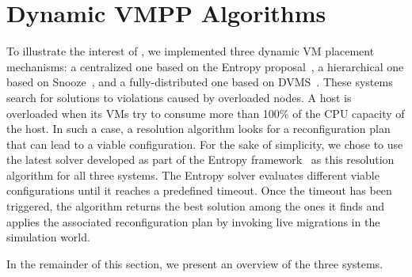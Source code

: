 \section{Dynamic VMPP Algorithms}
\label{sec:vm-schedulers}

To illustrate the interest of \vmps, we implemented three dynamic VM
placement mechanisms: a centralized one based on the Entropy
proposal~\cite{Hermenier:2009:ECM:1508293.1508300}, a hierarchical one
based on Snooze~\cite{feller:ccgrid12}, and a fully-distributed one
based on DVMS~\cite{quesnel:cpe2012}.
%
These systems search for solutions to violations caused by overloaded
nodes. A host is overloaded when its VMs try to consume more than
100\% of the CPU capacity of the host. In such a case, a resolution
algorithm looks for a reconfiguration plan that can lead to a viable
configuration. For the sake of simplicity, we chose to use the latest
solver developed as part of the Entropy
framework~\cite{hermenier:cp11} as this resolution algorithm for all
three systems.  The Entropy solver evaluates different viable
configurations until it reaches a predefined timeout.
Once the timeout has been triggered, the algorithm returns the best
solution among the ones it finds and applies the associated
reconfiguration plan by invoking live migrations in the simulation
world.
%
%


In the remainder of this section, we present an overview of the
three systems.


